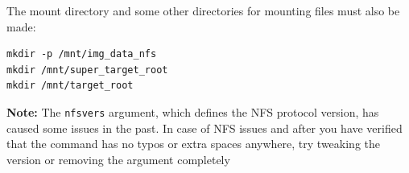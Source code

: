 \documentclass[a4paper,11pt]{article}
\newcommand{\note}{\textbf{Note: }}
\newcommand{\cmd}[1]{\texttt{#1}}
\begin{document}
The mount directory and some other directories for mounting files must also be made:

\begin{lstlisting}
mkdir -p /mnt/img_data_nfs
mkdir /mnt/super_target_root
mkdir /mnt/target_root
\end{lstlisting}

\note The \cmd{nfsvers} argument, which defines the NFS protocol version, has caused some issues in the past. In case of NFS issues and after you have verified that the command has no typos or extra spaces anywhere, try tweaking the version or removing the argument completely
\end{document}
